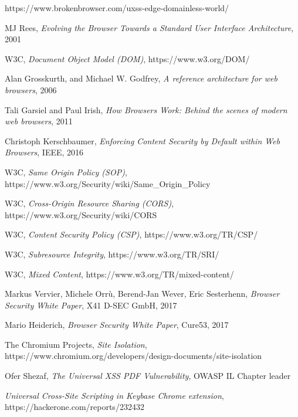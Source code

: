 \documentclass[journal]{IEEEtran}
\begin{document}

\begin{thebibliography}{1}

https://www.brokenbrowser.com/uxss-edge-domainless-world/

MJ Rees,
\textit{Evolving the Browser Towards a Standard User Interface Architecture}, 2001

W3C,
\textit{Document Object Model (DOM)},
https://www.w3.org/DOM/

Alan Grosskurth, and Michael W. Godfrey,
\textit{A reference architecture for web browsers}, 2006

Tali Garsiel and Paul Irish,
\textit{How Browsers Work: Behind the scenes of modern web browsers}, 2011

Christoph Kerschbaumer,
\textit{Enforcing Content Security by Default within Web Browsers}, IEEE, 2016

W3C,
\textit{Same Origin Policy (SOP)},
https://www.w3.org/Security/wiki/Same\_Origin\_Policy

W3C,
\textit{Cross-Origin Resource Sharing (CORS)},
https://www.w3.org/Security/wiki/CORS

W3C,
\textit{Content Security Policy (CSP)},
https://www.w3.org/TR/CSP/

W3C,
\textit{Subresource Integrity},
https://www.w3.org/TR/SRI/

W3C,
\textit{Mixed Content},
https://www.w3.org/TR/mixed-content/

Markus Vervier, Michele Orrù, Berend-Jan Wever, Eric Sesterhenn,
\textit{Browser Security White Paper},
X41 D-SEC GmbH, 2017
 
 
Mario Heiderich,
\textit{Browser Security White Paper},
Cure53, 2017

The Chromium Projects,
\textit{Site Isolation},
https://www.chromium.org/developers/design-documents/site-isolation

Ofer Shezaf,
\textit{The Universal XSS PDF Vulnerability},
OWASP IL Chapter leader

\textit{Universal Cross-Site Scripting in Keybase Chrome extension},
https://hackerone.com/reports/232432
 

\end{thebibliography}
\end{document}
